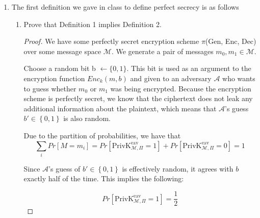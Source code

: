 \documentclass{article}
\begin{document}
\begin{enumerate}
\begin{enumerate}
\begin{proof}
        \begin{align*}
            P[M = m | C = c_1] = P[M = m \cap C = c_1] / P[c_1]
        \end{align*}

        The denominators are the same because any ciphertext is equally likely to occur, so the numerators are also the same. As a result, we have shown $P[M = m | C = c_0] = P[M = m | C = c_1]$.
        
        \end{proof}
        
    \end{enumerate}
  \item The first definition we gave in class to define perfect secrecy is as follows
    \begin{enumerate}
      \item Prove that Definition 1 implies Definition 2.

        \begin{proof}
          We have some perfectly secret encryption scheme $\pi$(Gen, Enc, Dec) over some message 
          space $\mathcal{M}$. We generate a pair of messages 
          $m_0, m_1 \in \mathcal{M}$.\newline

          Choose a random bit b $\leftarrow \{0, 1\}$. This bit is used as an argument to the encryption function $Enc_k(m, b)$ and given to an adversary $\mathcal{A}$ who wants to guess whether $m_0$ or $m_1$ was being encrypted. Because the encryption scheme is perfectly secret, we know that the ciphertext does not leak any additional information about the plaintext, which means that $\mathcal{A}$'s guess $b' \in \left\{0, 1\right\}$ is also random.\newline
          
            Due to the partition of probabilities, we have that
          \[
            \sum\limits_i Pr[M = m_i] =  
            Pr[\text{PrivK}_{\mathcal{M}, \Pi}^{\text{eav}} = 1] + 
            Pr[\text{PrivK}_{\mathcal{M}, \Pi}^{\text{eav}} = 0] = 1
          \]
          
          Since $\mathcal{A}$'s guess of $b' \in \left\{0, 1\right\}$ is effectively random, it agrees with $b$ exactly half of the time. This implies the following: 

          \[
            Pr[\text{PrivK}_{\mathcal{M}, \Pi}^{\text{eav}} = 1] = \frac{1}{2}
          \]
         
        \end{proof}


\end{enumerate}
\end{enumerate}
\end{document}
